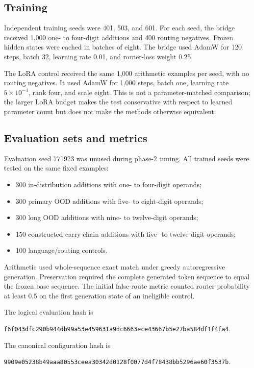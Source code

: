 \documentclass[11pt]{article}
\newcommand{\code}[1]{\texttt{#1}}
\begin{document}
\subsection{Training}

Independent training seeds were 401, 503, and 601. For each seed, the bridge
received 1,000 one- to four-digit additions and 400 routing negatives. Frozen
hidden states were cached in batches of eight. The bridge used AdamW for 120
steps, batch 32, learning rate 0.01, and router-loss weight 0.25.

The LoRA control received the same 1,000 arithmetic examples per seed, with no
routing negatives. It used AdamW for 1,000 steps, batch one, learning rate
\(5\times10^{-4}\), rank four, and scale eight. This is not a parameter-matched
comparison; the larger LoRA budget makes the test conservative with respect to
learned parameter count but does not make the methods otherwise equivalent.

\subsection{Evaluation sets and metrics}

Evaluation seed 771923 was unused during phase-2 tuning. All trained seeds were
tested on the same fixed examples:

\begin{itemize}
  \item 300 in-distribution additions with one- to four-digit operands;
  \item 300 primary OOD additions with five- to eight-digit operands;
  \item 300 long OOD additions with nine- to twelve-digit operands;
  \item 150 constructed carry-chain additions with five- to twelve-digit
  operands;
  \item 100 language/routing controls.
\end{itemize}

Arithmetic used whole-sequence exact match under greedy autoregressive
generation. Preservation required the complete generated token sequence to
equal the frozen base sequence. The initial false-route metric counted router
probability at least 0.5 on the first generation state of an ineligible
control.

The logical evaluation hash is
\begin{sloppypar}
\code{f6f043dfc290b944db99a53e459631a9dc6663ece43667b5e27ba584df1f4fa4}.
\end{sloppypar}
The canonical configuration hash is
\begin{sloppypar}
\code{9909e05238b49aaa80553ceea30342d0128f0077d4f78438bb5296ae60f3537b}.
\end{sloppypar}
\end{document}
